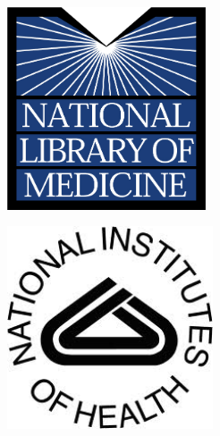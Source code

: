 \documentclass[landscape,a1]{a0poster}
\begin{document}
\begin{header}
\begin{minipage}[t]{0.24\textwidth}
  \par\vspace*{-2.5em}
	\begin{flushleft}
		\includegraphics[height=6cm]{images/nlm_logo.jpg}
	\end{flushleft}
\end{minipage}
\hfill
\begin{minipage}[t]{0.5\textwidth}
  \begin{center}
  

    { \bf {} }
  \end{center}
\end{minipage}
\hfill
\begin{minipage}[t]{0.24\textwidth}
	\par\vspace*{-2.5em}
	\begin{flushright}
 		\includegraphics[height=6cm]{images/nih_logo.jpg}
	\end{flushright}
\end{minipage}


\end{header}
\end{document}
